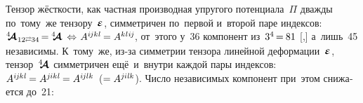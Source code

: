 \begin{otherlanguage}{russian}
\vspace{-0.1em} Тензор жёсткости, как частная производная упругого потенциала~$\Pi$ дважды по~тому~же тензору~$\mathboldepsilon$, симметричен по~первой и~второй паре индексов:
${\stiffnesstensor_{\hspace{.12ex} 12 \scalebox{0.6}[0.8]{$\rightleftarrows$} 34} \hspace{-0.25ex} = \hspace{-0.1ex} \stiffnesstensor \hspace{.5ex} \Leftrightarrow \hspace{.2ex} A^{i\hspace{-0.1ex}jk\hspace{.06ex}l} \hspace{-0.17ex} = A^{k\hspace{.06ex}l\hspace{.06ex}i\hspace{-0.1ex}j}\hspace{-0.25ex}}$,
от~этого у~36 компонент из~${3^4 \hspace{-0.25ex} = \hspace{-0.12ex} 81}$ [,] а~лишь~45 независимы.
К~тому~же, из\hbox{-}за симметрии тензора линейной деформации~$\mathboldepsilon$, тензор~$\hspace{.08ex}{^4\hspace{-0.72ex}\bm{\mathcal{A}}}\hspace{.08ex}$ симметричен ещё~и~внутри каждой пары индексов: ${A^{i\hspace{-0.1ex}j\hspace{-0.06ex}k\hspace{.06ex}l} \hspace{-0.16ex} = A^{j\hspace{-0.06ex}ik\hspace{.06ex}l} \hspace{-0.16ex} = A^{i\hspace{-0.1ex}jlk}}$~(${= A^{j\hspace{-0.06ex}i\hspace{.06ex}l\hspace{-0.06ex}k}}$). Число независимых компонент при~этом снижается до~21:


\end{otherlanguage}

